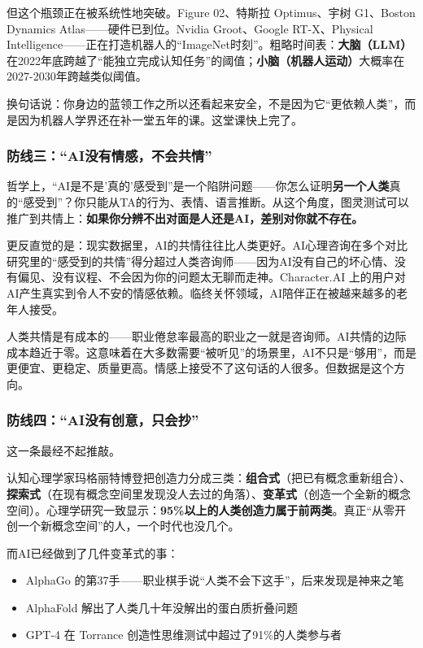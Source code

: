 \documentclass[11pt,a4paper]{ctexart}
\begin{document}
但这个瓶颈正在被系统性地突破。Figure 02、特斯拉 Optimus、宇树 G1、Boston Dynamics Atlas——硬件已到位。Nvidia Groot、Google RT-X、Physical Intelligence——正在打造机器人的“ImageNet时刻”。粗略时间表：\textbf{大脑（LLM）}在2022年底跨越了“能独立完成认知任务”的阈值；\textbf{小脑（机器人运动）}大概率在2027-2030年跨越类似阈值。

换句话说：你身边的蓝领工作之所以还看起来安全，不是因为它“更依赖人类”，而是因为机器人学界还在补一堂五年的课。这堂课快上完了。

\subsubsection{防线三：“AI没有情感，不会共情”}

哲学上，“AI是不是'真的'感受到”是一个陷阱问题——你怎么证明\textbf{另一个人类}真的“感受到”？你只能从TA的行为、表情、语言推断。从这个角度，图灵测试可以推广到共情上：\textbf{如果你分辨不出对面是人还是AI，差别对你就不存在。}

更反直觉的是：现实数据里，AI的共情往往比人类更好。AI心理咨询在多个对比研究里的“感受到的共情”得分超过人类咨询师——因为AI没有自己的坏心情、没有偏见、没有议程、不会因为你的问题太无聊而走神。Character.AI 上的用户对AI产生真实到令人不安的情感依赖。临终关怀领域，AI陪伴正在被越来越多的老年人接受。

人类共情是有成本的——职业倦怠率最高的职业之一就是咨询师。AI共情的边际成本趋近于零。这意味着在大多数需要“被听见”的场景里，AI不只是“够用”，而是更便宜、更稳定、质量更高。情感上接受不了这句话的人很多。但数据是这个方向。

\subsubsection{防线四：“AI没有创意，只会抄”}

这一条最经不起推敲。

认知心理学家玛格丽特\textperiodcentered{}博登把创造力分成三类：\textbf{组合式}（把已有概念重新组合）、\textbf{探索式}（在现有概念空间里发现没人去过的角落）、\textbf{变革式}（创造一个全新的概念空间）。心理学研究一致显示：\textbf{95\%以上的人类创造力属于前两类}。真正“从零开创一个新概念空间”的人，一个时代也没几个。

而AI已经做到了几件变革式的事：

\begin{itemize}
  \item AlphaGo 的第37手——职业棋手说“人类不会下这手”，后来发现是神来之笔
  \item AlphaFold 解出了人类几十年没解出的蛋白质折叠问题
  \item GPT-4 在 Torrance 创造性思维测试中超过了91\%的人类参与者
\end{itemize}
\end{document}
